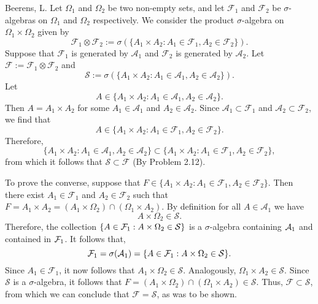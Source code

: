 \begin{solution}[2.13]{Beerens, L.}
    Let $\Omega_1$ and $\Omega_2$ be two non-empty sets, and let $\mathcal{F}_1$ and $\mathcal{F}_2$ be $\sigma$-algebras on $\Omega_1$ and $\Omega_2$ respectively. We consider the product $\sigma$-algebra on $\Omega_1\times\Omega_2$ given by
    $$
        \mathcal{F}_1\otimes\mathcal{F}_2:=\sigma(\{ A_1\times A_2: A_1\in\mathcal{F}_1, A_2\in\mathcal{F}_2 \}).
    $$
    Suppose that $\mathcal{F}_1$ is generated by $\mathcal{A}_1$ and $\mathcal{F}_2$ is generated by $\mathcal{A}_2$. Let $\mathcal{F}:=\mathcal{F}_1\otimes\mathcal{F}_2$ and
    $$
        \mathcal{S}:=\sigma(\{ A_1\times A_2: A_1\in\mathcal{A}_1, A_2\in\mathcal{A}_2 \}).
    $$
    Let
    $$
        A\in\{ A_1\times A_2: A_1\in\mathcal{A}_1, A_2\in\mathcal{A}_2 \}.
    $$
    Then $A=A_1\times A_2$ for some $A_1\in\mathcal{A}_1$ and $A_2\in\mathcal{A}_2$. Since $\mathcal{A}_1\subset\mathcal{F}_1$ and $\mathcal{A}_2\subset\mathcal{F}_2$, we find that
    $$
        A\in\{ A_1\times A_2: A_1\in\mathcal{F}_1, A_2\in\mathcal{F}_2 \}.
    $$
    Therefore,
    $$
        \{ A_1\times A_2: A_1\in\mathcal{A}_1, A_2\in\mathcal{A}_2 \}\subset\{ A_1\times A_2: A_1\in\mathcal{F}_1, A_2\in\mathcal{F}_2 \},
    $$
    from which it follows that $\mathcal{S}\subset\mathcal{F}$ (By Problem 2.12).

    To prove the converse, suppose that $F\in\{ A_1\times A_2: A_1\in\mathcal{F}_1, A_2\in\mathcal{F}_2 \}$. Then there exist $A_1\in\mathcal{F}_1$ and $A_2\in\mathcal{F}_2$ such that $F = A_1\times A_2 = (A_1\times\Omega_2)\cap(\Omega_1\times A_2)$. By definition for all $A\in\mathcal{A}_1$ we have
    $$
         A\times\Omega_2\in \mathcal{S}.
    $$
    Therefore, the collection $\{A \in \mathcal F_1: A\times \Omega_2 \in \mathcal S\}$ is a $\sigma$-algebra containing $\mathcal A_1$ and contained in $\mathcal F_1$. It follows that, 
    $$
    \mathcal F_1 = \sigma(\mathcal{A}_1) = \{A \in \mathcal F_1: A\times \Omega_2 \in \mathcal S\}.
    $$
    Since $A_1\in\mathcal{F}_1$, it now follows that $A_1\times\Omega_2\in \mathcal{S}$. Analogously, $\Omega_1\times A_2\in \mathcal{S}$. Since $\mathcal{S}$ is a $\sigma$-algebra, it follows that $F = (A_1\times\Omega_2)\cap(\Omega_1\times A_2) \in \mathcal{S}$. Thus, $\mathcal{F}\subset\mathcal{S}$, from which we can conclude that $\mathcal{F}=\mathcal{S}$, as was to be shown.
\end{solution}

